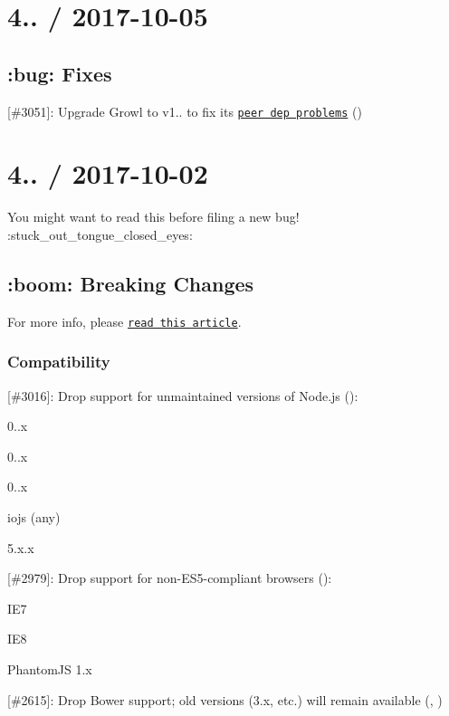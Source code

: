 \section*{4.. / 2017-\/10-\/05}

\subsection*{\+:bug\+: Fixes}


\begin{DoxyItemize}
\item \mbox{[}\#3051\mbox{]}\+: Upgrade Growl to v1.. to fix its \href{https://github.com/tj/node-growl/pull/68}{\tt peer dep problems} (\href{https://github.com/dpogue}{\tt })
\end{DoxyItemize}

\section*{4.. / 2017-\/10-\/02}

You might want to read this before filing a new bug! \+:stuck\+\_\+out\+\_\+tongue\+\_\+closed\+\_\+eyes\+:

\subsection*{\+:boom\+: Breaking Changes}

For more info, please \href{https://boneskull.com/mocha-v4-nears-release/}{\tt read this article}.

\subsubsection*{Compatibility}


\begin{DoxyItemize}
\item \mbox{[}\#3016\mbox{]}\+: Drop support for unmaintained versions of Node.\+js (\href{https://github.com/boneskull}{\tt })\+:
\begin{DoxyItemize}
\item 0..\+x
\item 0..\+x
\item 0..\+x
\item iojs (any)
\item 5.\+x.\+x
\end{DoxyItemize}
\item \mbox{[}\#2979\mbox{]}\+: Drop support for non-\/\+E\+S5-\/compliant browsers (\href{https://github.com/boneskull}{\tt })\+:
\begin{DoxyItemize}
\item I\+E7
\item I\+E8
\item Phantom\+JS 1.\+x
\end{DoxyItemize}
\item \mbox{[}\#2615\mbox{]}\+: Drop Bower support; old versions (3.\+x, etc.) will remain available (\href{https://github.com/ScottFreeCode}{\tt }, \href{https://github.com/boneskull}{\tt })
\end{DoxyItemize}

